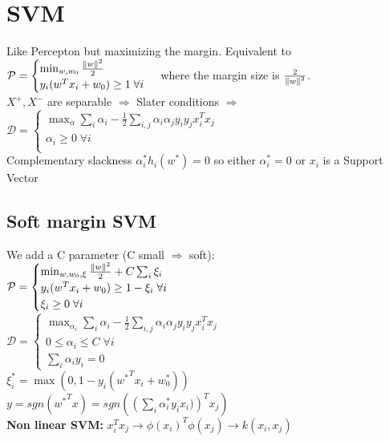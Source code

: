 \section{SVM} 
Like Percepton but maximizing the margin. Equivalent to\\
\(\mathcal{P} =
\begin{cases}
	\min_{w,w_0} \frac{\left\lVert w\right\rVert^2}{2}\\
	y_i(w^Tx_i +  w_0)\geq 1 \;\forall i\\
\end{cases}
\)
where the margin size is \(\frac{2}{\left\lVert w\right\rVert^2}\).\\
$X^+, X^-$ are separable $\Rightarrow$ Slater conditions $\Rightarrow$ \\
\(\mathcal{D} =
	\begin{cases}
		\max_{\alpha} \sum_i \alpha_i - \frac{1}{2}\sum_{i,j}\alpha_i\alpha_jy_iy_jx_i^Tx_j\\
		\alpha_i\geq 0 \;\forall i\\
	\end{cases}
		\)\\
Complementary slackness \(\alpha_i^*h_i(w^*)=0\) so either \(\alpha^*_i = 0\)  or \(x_i\) is a Support Vector
\subsection*{Soft margin SVM}
We add a C parameter (C small \(\Rightarrow\) soft):\\
\(\mathcal{P} =
\begin{cases}
	\min_{w,w_0, \xi} \frac{\left\lVert w\right\rVert^2}{2} + C\sum_i\xi_i\\
	y_i(w^Tx_i +  w_0)\geq 1 -\xi_i\;\forall i\\
	\xi_i\geq 0\;\forall i\\
\end{cases}
\)\\
\(\mathcal{D} =
\begin{cases}
	\max_{\alpha_i}\sum_i \alpha_i - \frac{1}{2}\sum_{i,j}\alpha_i\alpha_jy_iy_jx_i^Tx_j\\
	0\leq \alpha_i\leq C \;\forall i\\
	\sum_i \alpha_i y_i = 0
\end{cases}
\)\\
\(\xi_i^{*} = \max(0,1-y_i({w^*}^Tx_i + w_0^*))\)\\
$y = sgn\left({w^*}^Tx\right) = sgn\left(\left(\sum_i\alpha_i^*y_ix_i)\right)^Tx_j \right)$\\
\textbf{Non linear SVM: }$x_i^Tx_j \rightarrow \phi(x_i)^T\phi(x_j) \rightarrow k(x_i,x_j)$%

